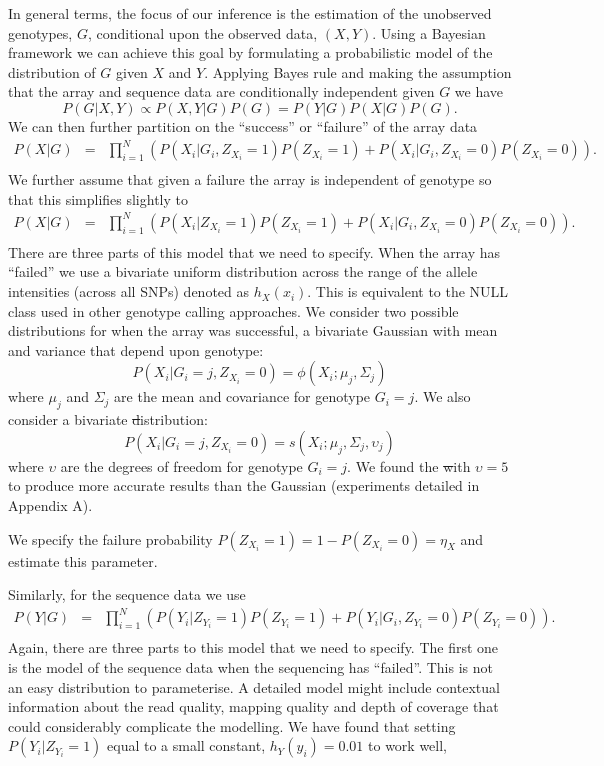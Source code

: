 In general terms, the focus of our inference is the estimation of the unobserved genotypes, $G$, conditional upon the observed data, $(X,Y)$. Using a Bayesian framework we can achieve this goal by formulating a probabilistic model of the distribution of $G$ given $X$ and $Y$. Applying Bayes rule and making the assumption that the array and sequence data are conditionally independent given $G$ we have
\begin{equation}
P(G|X,Y) \propto P(X,Y|G)P(G) = P(Y|G)P(X|G)P(G). \nonumber
\end{equation}
We can then further partition on the ``success'' or ``failure'' of the array data
\begin{eqnarray*}
P(X | G) & = &\prod_{i=1}^N \left(P(X_i|G_i, Z_{X_i}=1)P(Z_{X_i}=1) + P(X_i|G_i,Z_{X_i}=0)P(Z_{X_i}=0)\right).\\
\end{eqnarray*}
We further assume that given a failure the array is independent of genotype so that this simplifies slightly to
\begin{eqnarray*}
P(X | G) & = &\prod_{i=1}^N \left(P(X_i|Z_{X_i}=1)P(Z_{X_i}=1) + P(X_i|G_i,Z_{X_i}=0)P(Z_{X_i}=0)\right).\\
\end{eqnarray*}
There are three parts of this model that we need to specify. When the array has ``failed'' we use a bivariate uniform distribution across the range of the allele intensities (across all SNPs) denoted as $h_X(x_i)$. This is equivalent to the NULL class used in other genotype calling approaches. We consider two possible distributions for when the array was successful, a bivariate Gaussian with mean and variance that depend upon genotype:
$$P(X_i| G_i=j,Z_{X_i}=0) = \phi(X_i;\mu_j,\Sigma_j)$$
where $\mu_j$ and $\Sigma_j$ are the  mean and covariance for genotype $G_i=j$. We also consider  a bivariate \st distribution:
$$P(X_i| G_i=j,Z_{X_i}=0) = s(X_i;\mu_j,\Sigma_j,\upsilon_j)$$
where $\upsilon$ are the degrees of freedom for genotype $G_i=j$. We found the \st with $\upsilon=5$ to produce more accurate results than the Gaussian (experiments detailed in Appendix A).

We specify the failure probability $P(Z_{X_i}=1) = 1 - P(Z_{X_i}=0) =\eta_X$ and estimate this parameter.

Similarly, for the sequence data we use 
\begin{eqnarray*}
P(Y | G) & = &\prod_{i=1}^N \left(P(Y_i|Z_{Y_i}=1)P(Z_{Y_i}=1) + P(Y_i|G_i,Z_{Y_i}=0)P(Z_{Y_i}=0)\right).\\
\end{eqnarray*}
Again, there are three parts to this model that we need to specify. The first one is the model of the sequence data when the sequencing has ``failed''. This is not an easy distribution to parameterise. A detailed model might include contextual information about the read quality, mapping quality and depth of coverage that could considerably complicate the modelling. We have found that setting $P(Y_i|Z_{Y_i}=1)$ equal to a small constant, $h_Y(y_i) = 0.01$ to work well,

